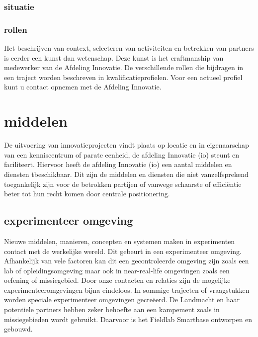 \documentclass[
]{book}
\begin{document}
\hypertarget{situatie}{%
\subsubsection{situatie}\label{situatie}}

\hypertarget{rollen}{%
\subsubsection{rollen}\label{rollen}}

Het beschrijven van context, selecteren van activiteiten en betrekken van partners is eerder een kunst dan wetenschap. Deze kunst is het craftmanship van medewerker van de Afdeling Innovatie. De verschillende rollen die bijdragen in een traject worden beschreven in kwalificatieprofielen. Voor een actueel profiel kunt u contact opnemen met de Afdeling Innovatie.

\hypertarget{middelen}{%
\section{middelen}\label{middelen}}

De uitvoering van innovatieprojecten vindt plaats op locatie en in eigenaarschap van een kenniscentrum of parate eenheid, de afdeling Innovatie (io) steunt en faciliteert. Hiervoor heeft de afdeling Innovatie (io) een aantal middelen en diensten tbeschikbaar. Dit zijn de middelen en diensten die niet vanzelfsprekend toegankelijk zijn voor de betrokken partijen of vanwege schaarste of efficiëntie beter tot hun recht komen door centrale positionering.

\hypertarget{experimenteer-omgeving}{%
\subsection{experimenteer omgeving}\label{experimenteer-omgeving}}

Nieuwe middelen, manieren, concepten en systemen maken in experimenten contact met de werkelijke wereld. Dit gebeurt in een experimenteer omgeving. Afhankelijk van vele factoren kan dit een gecontroleerde omgeving zijn zoals een lab of opleidingsomgeving maar ook in near-real-life omgevingen zoals een oefening of missiegebied. Door onze contacten en relaties zijn de mogelijke experimenteeromgevingen bijna eindeloos. In sommige trajecten of vraagstukken worden speciale experimenteer omgevingen gecreëerd. De Landmacht en haar potentiele partners hebben zeker behoefte aan een kampement zoals in missiegebieden wordt gebruikt. Daarvoor is het Fieldlab Smartbase ontworpen en gebouwd.
\end{document}
